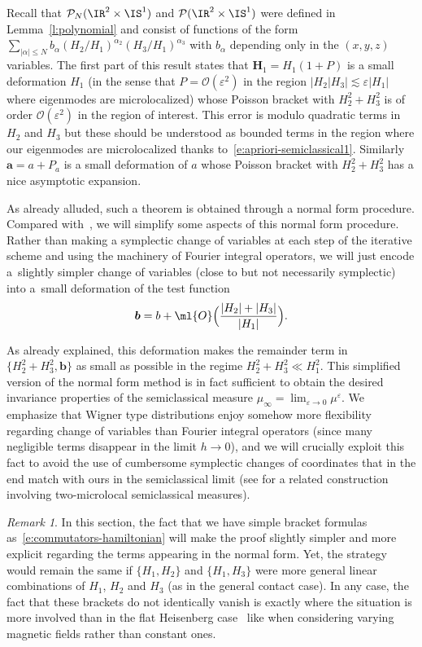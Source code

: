 \documentclass[JEP,XML,SOM,Unicode, NoEqCountersInSection,published]{cedram}
\theoremstyle{plain}
\theoremstyle{definition}
\theoremstyle{remark}
\newtheorem{rema}[theo]{Remark}
\begin{document}
Recall that $\mathcal{P}_N(\IR^2\times \IS^1)$ and $\mathcal{P}(\IR^2\times \IS^1)$ were defined in Lemma~\ref{l:polynomial} and consist of functions of the form $\sum_{|\alpha|\leq N} b_\alpha(H_2/H_1)^{\alpha_2}(H_3/H_1)^{\alpha_3}$ with $b_\alpha$ depending only in the $(x,y,z)$ variables. The first part of this result states that $\boldsymbol{H}_1=H_1(1+P)$ is a small deformation $H_1$ (in the sense that $P=\mathcal{O}(\varepsilon^2)$ in the region $|H_2|H_3|\lesssim\varepsilon|H_1|$ where eigenmodes are microlocalized) whose Poisson bracket with $H_2^2+H_3^2$ is of order $\mathcal{O}(\varepsilon^2)$ in the region of interest. This error is modulo quadratic terms in $H_2$ and $H_3$ but these should be understood as bounded terms in the region where our eigenmodes are microlocalized thanks to~\eqref{e:apriori-semiclassical1}. Similarly $\boldsymbol{a}=a+P_a$ is a small deformation of $a$ whose Poisson bracket with $H_2^2+H_3^2$ has a nice asymptotic expansion.

As already alluded, such a theorem is obtained through a normal form procedure. Compared with~\cite{ColindeVerdiereHillairetTrelat15}, we will simplify some aspects of this normal form procedure. Rather than making a symplectic change of variables at each step of the iterative scheme and using the machinery of Fourier integral operators, we will just encode a~slightly simpler change of variables (close to but not necessarily symplectic) into a~small deformation of the test function
\[
\boldsymbol{b} = b + \ml{O}\Bigl(\frac{ \vert H_2 \vert + \vert H_3 \vert}{\vert H_1 \vert} \Bigr).
\]

As already explained, this deformation makes the remainder term in $\{H_2^2+H_3^2, \boldsymbol{b}\}$ as small as possible in the regime $H_2^2+H_3^2\ll H_1^2$.
This simplified version of the normal form method is in fact sufficient to obtain the desired invariance properties of the semiclassical measure $\mu_\infty = \lim_{\varepsilon \to 0} \mu^\varepsilon$. We emphasize that Wigner type distributions enjoy somehow more flexibility regarding change of variables than Fourier integral operators (since many negligible terms disappear in the limit $h \to 0$), and we will crucially exploit this fact to avoid the use of cumbersome symplectic changes of coordinates that in the end match with ours in the semiclassical limit (see \cite[\S3.1]{ArnaizSun22} for a related construction involving two-microlocal semiclassical measures).

\begin{rema} In this section, the fact that we have simple bracket formulas as~\eqref{e:commutators-hamiltonian} will make the proof slightly simpler and more explicit regarding the terms appearing in the normal form. Yet, the strategy would remain the same if $\{H_1,H_2\}$ and $\{H_1,H_3\}$ were more general linear combinations of $H_1$, $H_2$ and $H_3$ (as in the general contact case). In any case, the fact that these brackets do not identically vanish is exactly where the situation is more involved than in the flat Heisenberg case~\cite{FermanianFischer21, FermanianLetrouit20} like when considering varying magnetic fields rather than constant ones.
\end{rema}
\end{document}
